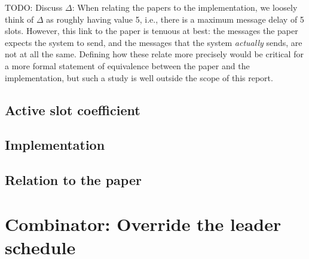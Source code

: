 TODO: Discuss $\Delta$: When relating the papers to the implementation, we
loosely think of $\Delta$ as roughly having value 5, i.e., there is a maximum
message delay of 5 slots. However, this link to the paper is tenuous at best:
the messages the paper expects the system to send, and the messages that the
system \emph{actually} sends, are not at all the same. Defining how these relate
more precisely would be critical for a more formal statement of equivalence
between the paper and the implementation, but such a study is well outside the
scope of this report.

\subsection{Active slot coefficient}
\label{praos:f}

\subsection{Implementation}

\subsection{Relation to the paper}
\label{praos-paper}

\cite{cryptoeprint:2018:378}

\section{Combinator: Override the leader schedule}
\label{consensus:override-leader-schedule}
